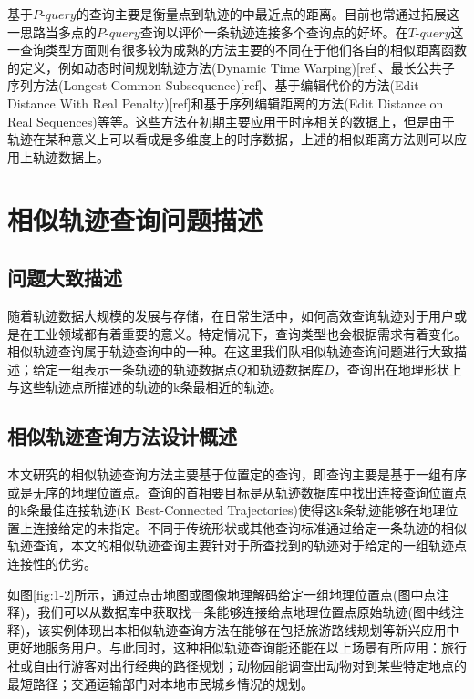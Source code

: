 基于$P$-$query$的查询主要是衡量点到轨迹的中最近点的距离。目前也常通过拓展这一思路当多点的$P$-$query$查询以评价一条轨迹连接多个查询点的好坏。在$T$-$query$这一查询类型方面则有很多较为成熟的方法主要的不同在于他们各自的相似距离函数的定义，例如动态时间规划轨迹方法(Dynamic Time Warping)[ref]、最长公共子序列方法(Longest Common Subsequence)[ref]、基于编辑代价的方法(Edit Distance With Real Penalty)[ref]和基于序列编辑距离的方法(Edit Distance on Real Sequences)等等。这些方法在初期主要应用于时序相关的数据上，但是由于轨迹在某种意义上可以看成是多维度上的时序数据，上述的相似距离方法则可以应用上轨迹数据上。
\\

\section{相似轨迹查询问题描述}
\label{sec:requirements}

\subsection{问题大致描述}
\label{subsec:question}
随着轨迹数据大规模的发展与存储，在日常生活中，如何高效查询轨迹对于用户或是在工业领域都有着重要的意义。特定情况下，查询类型也会根据需求有着变化。相似轨迹查询属于轨迹查询中的一种。在这里我们队相似轨迹查询问题进行大致描述；给定一组表示一条轨迹的轨迹数据点$Q$和轨迹数据库$D$，查询出在地理形状上与这些轨迹点所描述的轨迹的k条最相近的轨迹。

\subsection{相似轨迹查询方法设计概述}
\label{subsec:requirements}
本文研究的相似轨迹查询方法主要基于位置定的查询，即查询主要是基于一组有序或是无序的地理位置点。查询的首相要目标是从轨迹数据库中找出连接查询位置点的k条最佳连接轨迹(K Best-Connected Trajectories)使得这k条轨迹能够在地理位置上连接给定的未指定。不同于传统形状或其他查询标准通过给定一条轨迹的相似轨迹查询，本文的相似轨迹查询主要针对于所查找到的轨迹对于给定的一组轨迹点连接性的优劣。

如图\ref{fig:1-2}所示，通过点击地图或图像地理解码给定一组地理位置点(图中点注释)，我们可以从数据库中获取找一条能够连接给点地理位置点原始轨迹(图中线注释)，该实例体现出本相似轨迹查询方法在能够在包括旅游路线规划等新兴应用中更好地服务用户。与此同时，这种相似轨迹查询能还能在以上场景有所应用：旅行社或自由行游客对出行经典的路径规划；动物园能调查出动物对到某些特定地点的最短路径；交通运输部门对本地市民城乡情况的规划。

